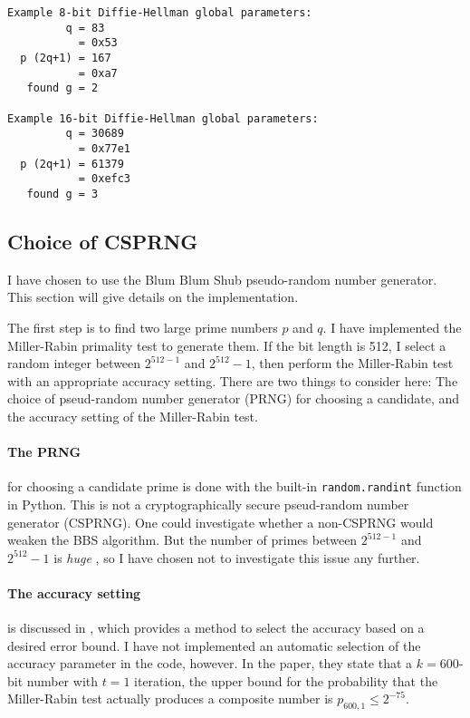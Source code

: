 \documentclass[a4paper,english,12pt]{article}
\begin{document}
\begin{lstlisting}[caption={Finding Diffie-Hellman parameters}, label=verb:dh.ex]
Example 8-bit Diffie-Hellman global parameters:
         q = 83
           = 0x53
  p (2q+1) = 167
           = 0xa7
   found g = 2

Example 16-bit Diffie-Hellman global parameters:
         q = 30689
           = 0x77e1
  p (2q+1) = 61379
           = 0xefc3
   found g = 3
\end{lstlisting}

\subsection{Choice of CSPRNG}
I have chosen to use the Blum Blum Shub \cite{bbs} pseudo-random number
generator. This section will give details on the implementation.

The first step is to find two large prime numbers $p$ and $q$. I have
implemented the Miller-Rabin \cite{miller.rabin} primality test to generate
them.
%
If the bit length is 512, I select a random integer between $2^{512-1}$ and
$2^{512}-1$, then perform the Miller-Rabin test with an appropriate accuracy
setting. There are two things to consider here: The choice of pseud-random
number generator (PRNG) for choosing a candidate, and the accuracy setting of
the Miller-Rabin test.

\paragraph{The PRNG} for choosing a candidate prime is done with the built-in
\texttt{random.randint} function in Python. This is not a cryptographically
secure pseud-random number generator (CSPRNG). One could investigate whether a
non-CSPRNG would weaken the BBS algorithm. But the number of primes between
$2^{512-1}$ and $2^{512}-1$ is \textit{huge} \cite{wiki:prime.counting}, so I
have chosen not to investigate this issue any further.

\paragraph{The accuracy setting} is discussed in \cite{damgaard1993average}, which
provides a method to select the accuracy based on a desired error bound. I have
not implemented an automatic selection of the accuracy parameter in the code,
however. In the paper, they state that a $k=600$-bit number with $t=1$
iteration, the upper bound for the probability that the Miller-Rabin test
actually produces a composite number is $p_{600, 1} \leqslant 2^{-75}$.
\end{document}
